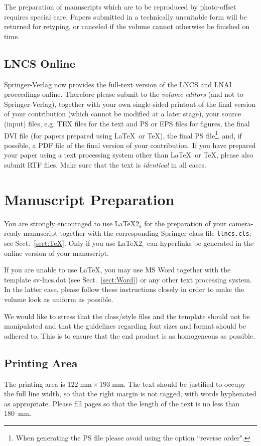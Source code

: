 \documentclass[a4paper]{llncs}
\begin{document}
The preparation of manuscripts which are to be reproduced by
photo-offset requires special care. Papers submitted in a
technically unsuitable form will be returned for retyping, or canceled
if the volume cannot otherwise be finished on time.

\subsection{LNCS Online}
\label{sect:lncs_online}

Springer-Verlag now provides the full-text version of
the LNCS and LNAI proceedings online. Therefore please
submit to the {\it volume editors} (and not to Springer-Verlag),
together
with your own single-sided printout of the final version of your
contribution (which cannot be modified at a later stage), your source
(input) files, e.g. TEX files for the text
and PS or EPS files for figures, the final DVI file (for papers prepared
using \LaTeX\ or \TeX), the final
PS file\footnote{When generating the PS file please avoid using the
option ``reverse order".}, and, if possible, a PDF file of the final
version of your contribution.
If you have prepared your paper using a text processing system other
than \LaTeX\ or \TeX, please also submit RTF files.
Make sure that the text is {\em identical} in all cases.


\section{Manuscript Preparation}

You are strongly encouraged to use \LaTeX2$_\varepsilon$ for the
preparation of your
camera-ready manuscript together with the corresponding Springer
class file \verb+llncs.cls+;
see Sect.~\ref{sect:TeX}. Only if you use \LaTeX2$_\varepsilon$ can
hyperlinks be generated in the online version of your manuscript.

If you are unable to use \LaTeX, you may use MS Word together with the
template sv-lncs.dot (see Sect.~\ref{sect:Word}) or any other text
processing system. In the latter case, please follow
these instructions closely in order to make the volume
look as uniform as possible.

We would like to stress that the class/style files and the template
should not be manipulated and that the guidelines regarding font sizes
and format should be adhered to. This is to ensure that the end product
is as homogeneous as possible.


\subsection{Printing Area}
The printing area is $122  \; \mbox{mm} \times 193 \;
\mbox{mm}$.
The text should be justified to occupy the full line width,
so that the right margin is not ragged, with words hyphenated as
appropriate. Please fill pages so that the length of the text
is no less than 180~mm.
\end{document}
